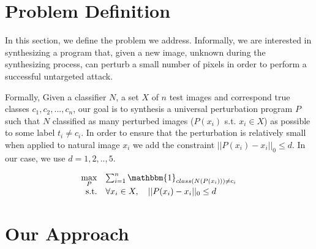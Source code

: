 \documentclass[11pt]{article}
\begin{document}
\section{Problem Definition}
In this section, we define the problem we address. Informally, we are interested in synthesizing a program that, given a new image, unknown during the synthesizing process, can perturb a small number of pixels in order to perform a successful untargeted attack.

Formally, Given a classifier $N$, a set $X$ of $n$ test images and correspond true classes $c_1, c_2, ..., c_n$, our goal is to synthesis a universal perturbation program $P$ such that $N$ classified as many perturbed images ($P(x_i)$ s.t. $x_i\in X$) as possible to some label $t_i \neq c_i$. In order to ensure that the perturbation is relatively small when applied to natural image $x_i$ we add the constraint $||P(x_i)-x_i||_0\leq d$. In our case, we use $d={1, 2,..,5}$.

\begin{equation*}
\begin{array}{rrclcl}
\displaystyle \max_P & \multicolumn{2}{l}{\sum_{i=1}^n \mathbbm{1}_{class(N(P(x_i)))\neq c_i}}\\
\textrm{s.t.} & \forall x_i\in X,\quad||P(x_i)-x_i||_0\leq d
\end{array}
\end{equation*}


\section{Our Approach}
\end{document}
